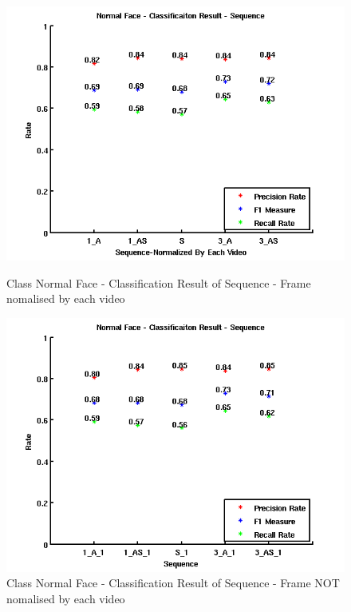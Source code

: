 \begin{figure}[ht]
\centering
\begin{minipage}{.5\textwidth}
  \centering
  \captionsetup{justification=centering,margin=1cm}
  \includegraphics[width=\linewidth]{imgs/Result_NormalFace_Sequence.png}
  \caption{Class Normal Face - Classification Result of Sequence - Frame nomalised by each video}
  \label{fig:RNS}
\end{minipage}%
\begin{minipage}{.5\textwidth}
  \centering
  \captionsetup{justification=centering,margin=1cm}
  \includegraphics[width=\linewidth]{imgs/Result_NormalFace_Sequence_1.png}
  \caption{Class Normal Face - Classification Result of Sequence - Frame NOT nomalised by each video}
  \label{fig:RNS1}
\end{minipage}
\end{figure}

